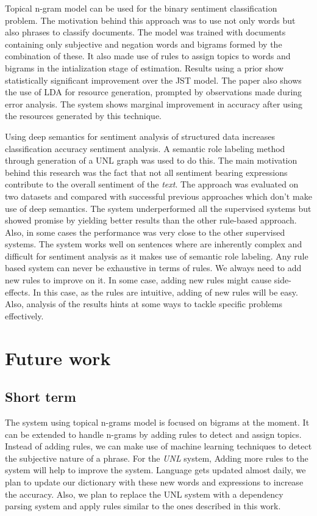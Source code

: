 Topical n-gram model can be used for the binary sentiment classification problem. The motivation behind this approach was to use not only words but also 
phrases to classify documents. The model was trained with documents containing only subjective and negation words and bigrams formed by the combination of 
these. It also made use of rules to assign topics to words and bigrams in the intialization stage of estimation. Results using a prior show statistically 
significant improvement over the JST model. The paper also shows the use of LDA for resource generation, prompted by observations made during error analysis. 
The system shows marginal improvement in accuracy after using the resources generated by this technique.

Using deep semantics for sentiment analysis of structured data increases classification accuracy sentiment analysis. A semantic role labeling method through 
generation of a UNL graph was used to do this. The main motivation behind this research was the fact that not all sentiment bearing expressions contribute to
the overall sentiment of the \textit{text}. The approach was evaluated on two datasets and compared with successful previous approaches which don't make use 
of deep semantics. The system underperformed all the supervised systems but showed promise by yielding better results than the other rule-based approach. Also, 
in some cases the performance was very close to the other supervised systems. The system works well on sentences where are inherently complex and difficult 
for sentiment analysis as it makes use of semantic role labeling. Any rule based system can never be exhaustive in terms of rules. We always need to add new 
rules to improve on it. In some case, adding new rules might cause side-effects. In this case, as the rules are intuitive, adding of new rules will be easy. 
Also, analysis of the results hints at some ways to tackle specific problems effectively.

\section{Future work}

\subsection{Short term}
The system using topical n-grams model is focused on bigrams at the moment. It can be extended to handle n-grams by adding rules to detect and assign topics. 
Instead of adding rules, we can make use of machine learning techniques to detect the subjective nature of a phrase. For the \textit{UNL} system, Adding more 
rules to the system will help to improve the system. Language gets updated almost daily, we plan to update our dictionary with these new words and expressions 
to increase the accuracy. Also, we plan to replace the UNL system with a dependency parsing system and apply rules similar to the ones described in this work.

